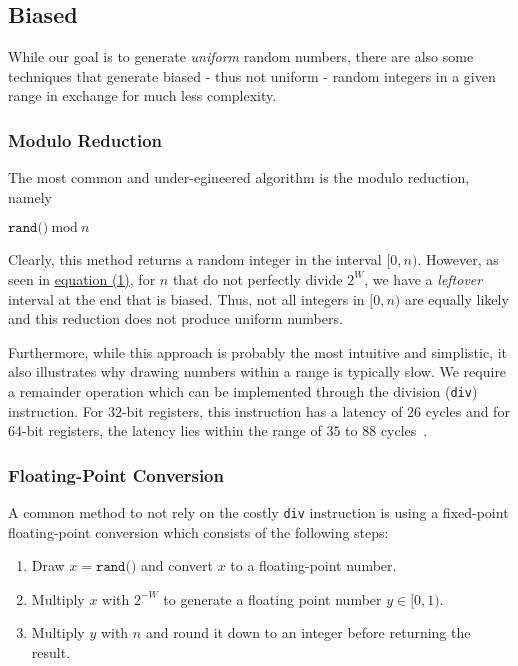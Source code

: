 \documentclass[a4paper, UKenglish, cleveref, autoref, thm-restate]{lipics-v2021}
\newcommand{\Mod}[1]{\ \mathrm{mod}\ #1}
\begin{document}
\subsection{Biased}
While our goal is to generate \emph{uniform} random numbers, there are also some techniques that generate biased - thus not uniform - random integers in a given range in exchange for much less complexity.

\subsubsection{Modulo Reduction}\label{sec:2.1.1}
The most common and under-egineered algorithm is the modulo reduction, namely
\begin{center}
    $\texttt{rand()} \Mod n$
\end{center}
Clearly, this method returns a random integer in the interval $[0,n)$.
However, as seen in \hyperref[eq:1]{equation (1)}, for $n$ that do not perfectly divide $2^W$, we have a \emph{leftover} interval at the end that is biased.
Thus, not all integers in $[0,n)$ are equally likely and this reduction does not produce uniform numbers.

Furthermore, while this approach is probably the most intuitive and simplistic, it also illustrates why drawing numbers within a range is typically slow.
We require a remainder operation which can be implemented through the division (\texttt{div}) instruction.
For $32$-bit registers, this instruction has a latency of $26$ cycles and for $64$-bit registers, the latency lies within the range of $35$ to $88$ cycles~\cite{Instructions}.


\subsubsection{Floating-Point Conversion}\label{sec:2.1.2}
A common method to not rely on the costly \texttt{div} instruction is using a fixed-point floating-point conversion which consists of the following steps:
\begin{enumerate}
    \item Draw $x = \texttt{rand()}$ and convert $x$ to a floating-point number.
    \item Multiply $x$ with $2^{-W}$ to generate a floating point number $y \in [0,1)$.
    \item Multiply $y$ with $n$ and round it down to an integer before returning the result.
\end{enumerate}
\end{document}
